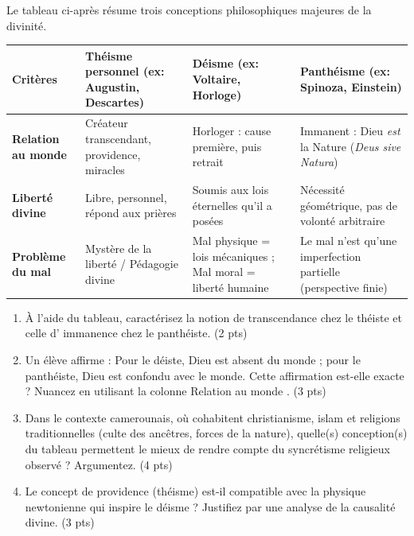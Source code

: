 \documentclass[11pt]{article}
\begin{document}
\begin{exercice}
Le tableau ci-après résume trois conceptions philosophiques majeures de la divinité.

\begin{tabularx}{\linewidth}{>{\bfseries}l X X X}
\toprule
\textbf{Critères} & \textbf{Théisme personnel (ex: Augustin, Descartes)} & \textbf{Déisme (ex: Voltaire, Horloge)} & \textbf{Panthéisme (ex: Spinoza, Einstein)} \\
\midrule
Relation au monde & Créateur transcendant, providence, miracles & Horloger : cause première, puis retrait & Immanent : Dieu \textit{est} la Nature (\textit{Deus sive Natura}) \\
Liberté divine & Libre, personnel, répond aux prières & Soumis aux lois éternelles qu'il a posées & Nécessité géométrique, pas de volonté arbitraire \\
Problème du mal & Mystère de la liberté / Pédagogie divine & Mal physique = lois mécaniques ; Mal moral = liberté humaine & Le mal n'est qu'une imperfection partielle (perspective finie) \\
\bottomrule
\end{tabularx}

\begin{enumerate}
    \item À l'aide du tableau, caractérisez la notion de \og transcendance \fg{} chez le théiste et celle d' \og immanence \fg{} chez le panthéiste. (2 pts)
    \item Un élève affirme : \og Pour le déiste, Dieu est absent du monde ; pour le panthéiste, Dieu est confondu avec le monde. \fg{} Cette affirmation est-elle exacte ? Nuancez en utilisant la colonne \og Relation au monde \fg{}. (3 pts)
    \item Dans le contexte camerounais, où cohabitent christianisme, islam et religions traditionnelles (culte des ancêtres, forces de la nature), quelle(s) conception(s) du tableau permettent le mieux de rendre compte du syncrétisme religieux observé ? Argumentez. (4 pts)
    \item Le concept de \og providence \fg{} (théisme) est-il compatible avec la physique newtonienne qui inspire le déisme ? Justifiez par une analyse de la causalité divine. (3 pts)
\end{enumerate}
\end{exercice}
\end{document}
